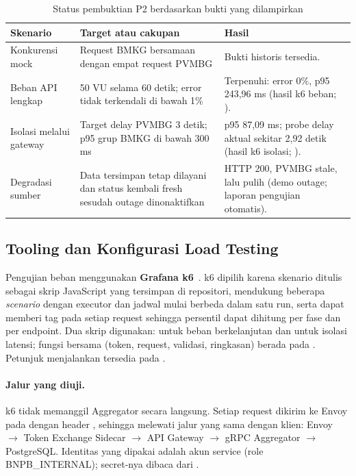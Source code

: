 \begin{table}[htbp]
    \centering
    \small
    \caption{Status pembuktian P2 berdasarkan bukti yang dilampirkan}
    \begin{tabularx}{\textwidth}{@{}P{0.25\textwidth}X P{0.20\textwidth}@{}}
        \toprule
        \textbf{Skenario} & \textbf{Target atau cakupan} & \textbf{Hasil} \\
        \midrule
        Konkurensi mock & Request BMKG bersamaan dengan empat request PVMBG & Bukti historis tersedia. \\
        Beban API lengkap & 50 VU selama 60 detik; error tidak terkendali di bawah 1\% & Terpenuhi: error 0\%, p95 243,96 ms (hasil k6 beban; ). \\
        Isolasi melalui gateway & Target delay PVMBG 3 detik; p95 grup BMKG di bawah 300 ms & p95 87,09 ms; probe delay aktual sekitar 2,92 detik (hasil k6 isolasi; ). \\
        Degradasi sumber & Data tersimpan tetap dilayani dan status kembali fresh sesudah outage dinonaktifkan & HTTP 200, PVMBG stale, lalu pulih (demo outage; laporan pengujian otomatis). \\
        \bottomrule
    \end{tabularx}
\end{table}

\subsection{Tooling dan Konfigurasi Load Testing}

Pengujian beban menggunakan \textbf{Grafana k6}~\cite{k6}. k6 dipilih karena
skenario ditulis sebagai skrip JavaScript yang tersimpan di repositori, mendukung
beberapa \emph{scenario} dengan executor dan jadwal mulai berbeda dalam satu run,
serta dapat memberi tag pada setiap request sehingga persentil dapat dihitung per
fase dan per endpoint. Dua skrip digunakan:
 untuk beban berkelanjutan dan
 untuk isolasi latensi; fungsi bersama
(token, request, validasi, ringkasan) berada pada .
Petunjuk menjalankan tersedia pada .

\paragraph{Jalur yang diuji.} k6 tidak memanggil Aggregator secara langsung.
Setiap request dikirim ke Envoy pada  dengan header
, sehingga melewati jalur yang sama dengan klien:
Envoy $\rightarrow$  Token Exchange Sidecar $\rightarrow$
API Gateway $\rightarrow$ gRPC Aggregator $\rightarrow$ PostgreSQL. Identitas yang
dipakai adalah akun service  (role BNPB\_INTERNAL); secret-nya dibaca
dari .

